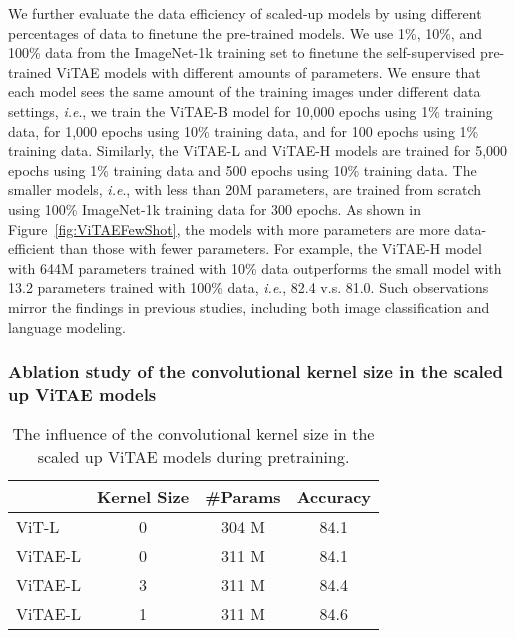 \documentclass[twocolumn]{svjour3}          \smartqed  \usepackage{natbib}
\newcommand{\ie}{i.e}
\def\onedot{.\xspace}
\def\ie{\emph{i.e}\onedot}
\begin{document}
We further evaluate the data efficiency of scaled-up models by using different percentages of data to finetune the pre-trained models. We use 1\%, 10\%, and 100\% data from the ImageNet-1k training set to finetune the self-supervised pre-trained ViTAE models with different amounts of parameters. We ensure that each model sees the same amount of the training images under different data settings, \ie, we train the ViTAE-B model for 10,000 epochs using 1\% training data, for 1,000 epochs using 10\% training data, and for 100 epochs using 1\% training data. Similarly, the ViTAE-L and ViTAE-H models are trained for 5,000 epochs using 1\% training data and 500 epochs using 10\% training data. The smaller models, \ie, with less than 20M parameters, are trained from scratch using 100\% ImageNet-1k training data for 300 epochs. As shown in Figure~\ref{fig:ViTAEFewShot}, the models with more parameters are more data-efficient than those with fewer parameters. For example, the ViTAE-H model with 644M parameters trained with 10\% data outperforms the small model with 13.2 parameters trained with 100\% data, \ie, 82.4 v.s. 81.0.
Such observations mirror the findings in previous studies, including both image classification and language modeling.

\subsubsection{Ablation study of the convolutional kernel size in the scaled up ViTAE models}

\begin{table}[htbp]
  \centering
   \small
  \caption{The influence of the convolutional kernel size in the scaled up ViTAE models during pretraining.}
    \begin{tabular}{l|cc|c}
    \hline
          & Kernel Size & \#Params & Accuracy \\
    \hline
    ViT-L & 0     & 304 M  & 84.1 \\
    ViTAE-L & 0     & 311 M  & 84.1 \\
    ViTAE-L & 3     & 311 M   & 84.4 \\
    ViTAE-L & 1     & 311 M  & 84.6 \\
    \hline
    \end{tabular}\label{tab:ViTAEAblationKernel}\end{table}
\end{document}
